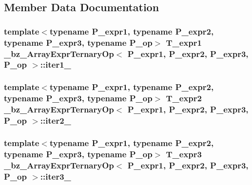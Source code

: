 \subsection{Member Data Documentation}
\hypertarget{class__bz__ArrayExprTernaryOp_aaf3916a8aa781a5dd0db6eff09b4e690}{}
\subsubsection[{iter1\+\_\+}]{\setlength{\rightskip}{0pt plus 5cm}template$<$typename P\+\_\+expr1, typename P\+\_\+expr2, typename P\+\_\+expr3, typename P\+\_\+op$>$ {\bf T\+\_\+expr1} {\bf \+\_\+bz\+\_\+\+Array\+Expr\+Ternary\+Op}$<$ P\+\_\+expr1, P\+\_\+expr2, P\+\_\+expr3, P\+\_\+op $>$\+::iter1\+\_\+\hspace{0.3cm}{\ttfamily [protected]}}\label{class__bz__ArrayExprTernaryOp_aaf3916a8aa781a5dd0db6eff09b4e690}
\hypertarget{class__bz__ArrayExprTernaryOp_a81b5d29c3eb018ba6b03887ecfd56073}{}
\subsubsection[{iter2\+\_\+}]{\setlength{\rightskip}{0pt plus 5cm}template$<$typename P\+\_\+expr1, typename P\+\_\+expr2, typename P\+\_\+expr3, typename P\+\_\+op$>$ {\bf T\+\_\+expr2} {\bf \+\_\+bz\+\_\+\+Array\+Expr\+Ternary\+Op}$<$ P\+\_\+expr1, P\+\_\+expr2, P\+\_\+expr3, P\+\_\+op $>$\+::iter2\+\_\+\hspace{0.3cm}{\ttfamily [protected]}}\label{class__bz__ArrayExprTernaryOp_a81b5d29c3eb018ba6b03887ecfd56073}
\hypertarget{class__bz__ArrayExprTernaryOp_a2a52ad2adb9af512f88a3a4ce4dff21b}{}
\subsubsection[{iter3\+\_\+}]{\setlength{\rightskip}{0pt plus 5cm}template$<$typename P\+\_\+expr1, typename P\+\_\+expr2, typename P\+\_\+expr3, typename P\+\_\+op$>$ {\bf T\+\_\+expr3} {\bf \+\_\+bz\+\_\+\+Array\+Expr\+Ternary\+Op}$<$ P\+\_\+expr1, P\+\_\+expr2, P\+\_\+expr3, P\+\_\+op $>$\+::iter3\+\_\+\hspace{0.3cm}{\ttfamily [protected]}}\label{class__bz__ArrayExprTernaryOp_a2a52ad2adb9af512f88a3a4ce4dff21b}
\hypertarget{class__bz__ArrayExprTernaryOp_ab0747b722ffa00c636081d47f5f864c0}{}
